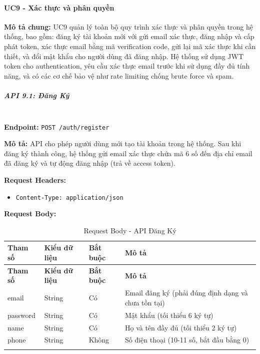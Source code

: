 \paragraph{UC9 - Xác thực và phân quyền}

\textbf{Mô tả chung:} UC9 quản lý toàn bộ quy trình xác thực và phân quyền trong hệ thống, bao gồm: đăng ký tài khoản mới với gửi email xác thực, đăng nhập và cấp phát token, xác thực email bằng mã verification code, gửi lại mã xác thực khi cần thiết, và đổi mật khẩu cho người dùng đã đăng nhập. Hệ thống sử dụng JWT token cho authentication, yêu cầu xác thực email trước khi sử dụng đầy đủ tính năng, và có các cơ chế bảo vệ như rate limiting chống brute force và spam.

\subparagraph{API 9.1: Đăng Ký}~\\

\textbf{Endpoint:} \texttt{POST /auth/register}

\textbf{Mô tả:} API cho phép người dùng mới tạo tài khoản trong hệ thống. Sau khi đăng ký thành công, hệ thống gửi email xác thực chứa mã 6 số đến địa chỉ email đã đăng ký và tự động đăng nhập (trả về access token).

\textbf{Request Headers:}
\begin{itemize}
    \item \texttt{Content-Type: application/json}
\end{itemize}

\textbf{Request Body:}

\small
\begin{longtable}{|>{\raggedright\arraybackslash}p{3.5cm}|>{\raggedright\arraybackslash}p{2.5cm}|>{\raggedright\arraybackslash}p{2cm}|>{\raggedright\arraybackslash}p{5.5cm}|}
\hline
\textbf{Tham số} & \textbf{Kiểu dữ liệu} & \textbf{Bắt buộc} & \textbf{Mô tả} \\
\hline
\endfirsthead
\hline
\textbf{Tham số} & \textbf{Kiểu dữ liệu} & \textbf{Bắt buộc} & \textbf{Mô tả} \\
\hline
\endhead
email & String & Có & Email đăng ký (phải đúng định dạng và chưa tồn tại) \\
\hline
password & String & Có & Mật khẩu (tối thiểu 6 ký tự) \\
\hline
name & String & Có & Họ và tên đầy đủ (tối thiểu 2 ký tự) \\
\hline
phone & String & Không & Số điện thoại (10-11 số, bắt đầu bằng 0) \\
\hline
\caption{Request Body - API Đăng Ký}
\end{longtable}

